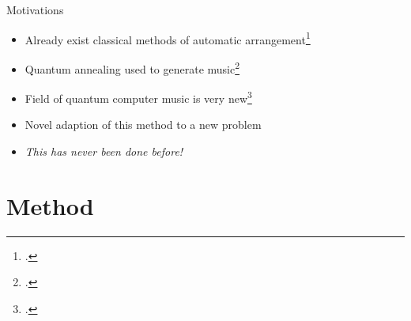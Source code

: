 \documentclass[handout]{beamer}
\begin{document}
\begin{frame}{Motivations}
    
    \begin{itemize}[<+(1)->]
        \item Already exist classical methods of automatic arrangement\footcite{huang_towards_2012,nakamura_statistical_2018,li_automatic_2019}
        \item Quantum annealing used to generate music\footcite{freedline_algorhythms_2021,arya_music_2022,}
        \item Field of quantum computer music is very new\footcite{miranda_quantum_2022}
        \item Novel adaption of this method to a new problem
        \item \emph{This has never been done before!}
    \end{itemize}
    
\end{frame}

\section{Method} %
\end{document}
